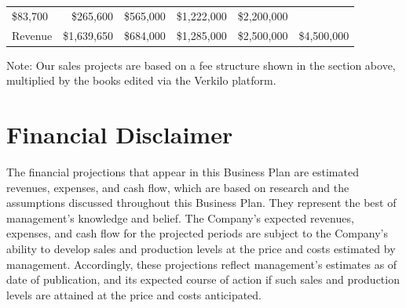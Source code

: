 \documentclass[10pt,openany]{book}
\begin{document}
\begin{longtable}[]{@{}lrrrrr@{}}
\begin{minipage}[t]{0.12\columnwidth}
\$83,700\strut
\end{minipage} & \begin{minipage}[t]{0.12\columnwidth}\raggedleft
\$265,600\strut
\end{minipage} & \begin{minipage}[t]{0.12\columnwidth}\raggedleft
\$565,000\strut
\end{minipage} & \begin{minipage}[t]{0.12\columnwidth}\raggedleft
\$1,222,000\strut
\end{minipage} & \begin{minipage}[t]{0.12\columnwidth}\raggedleft
\$2,200,000\strut
\end{minipage}\tabularnewline
\begin{minipage}[t]{0.25\columnwidth}\raggedright
Revenue\strut
\end{minipage} & \begin{minipage}[t]{0.12\columnwidth}\raggedleft
\$1,639,650\strut
\end{minipage} & \begin{minipage}[t]{0.12\columnwidth}\raggedleft
\$684,000\strut
\end{minipage} & \begin{minipage}[t]{0.12\columnwidth}\raggedleft
\$1,285,000\strut
\end{minipage} & \begin{minipage}[t]{0.12\columnwidth}\raggedleft
\$2,500,000\strut
\end{minipage} & \begin{minipage}[t]{0.12\columnwidth}\raggedleft
\$4,500,000\strut
\end{minipage}\tabularnewline
\bottomrule
\end{longtable}

Note: Our sales projects are based on a fee structure shown in the
section above, multiplied by the books edited via the Verkilo platform.

\hypertarget{financial-disclaimer}{%
\section{Financial Disclaimer}\label{financial-disclaimer}}

The financial projections that appear in this Business Plan are
estimated revenues, expenses, and cash flow, which are based on research
and the assumptions discussed throughout this Business Plan. They
represent the best of management's knowledge and belief. The Company's
expected revenues, expenses, and cash flow for the projected periods are
subject to the Company's ability to develop sales and production levels
at the price and costs estimated by management. Accordingly, these
projections reflect management's estimates as of date of publication,
and its expected course of action if such sales and production levels
are attained at the price and costs anticipated.
\end{document}
